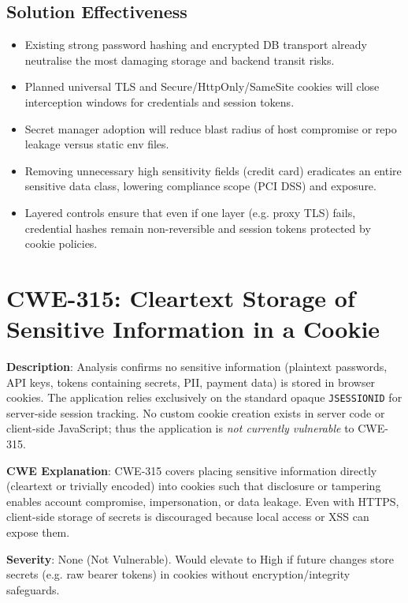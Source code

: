 \documentclass[]{UCD_CS_FYP_Report}
\begin{document}
\subsection{Solution Effectiveness}
\begin{itemize}
	\item Existing strong password hashing and encrypted DB transport already neutralise the most damaging storage and backend transit risks.
	\item Planned universal TLS and Secure/HttpOnly/SameSite cookies will close interception windows for credentials and session tokens.
	\item Secret manager adoption will reduce blast radius of host compromise or repo leakage versus static env files.
	\item Removing unnecessary high sensitivity fields (credit card) eradicates an entire sensitive data class, lowering compliance scope (PCI DSS) and exposure.
	\item Layered controls ensure that even if one layer (e.g. proxy TLS) fails, credential hashes remain non-reversible and session tokens protected by cookie policies.
\end{itemize}

\section{CWE-315: Cleartext Storage of Sensitive Information in a Cookie}

	\textbf{Description}: Analysis confirms no sensitive information (plaintext passwords, API keys, tokens containing secrets, PII, payment data) is stored in browser cookies. The application relies exclusively on the standard opaque \texttt{JSESSIONID} for server-side session tracking. No custom cookie creation exists in server code or client-side JavaScript; thus the application is \emph{not currently vulnerable} to CWE-315.

	\textbf{CWE Explanation}: CWE-315 covers placing sensitive information directly (cleartext or trivially encoded) into cookies such that disclosure or tampering enables account compromise, impersonation, or data leakage. Even with HTTPS, client-side storage of secrets is discouraged because local access or XSS can expose them.

	\textbf{Severity}: None (Not Vulnerable). Would elevate to High if future changes store secrets (e.g. raw bearer tokens) in cookies without encryption/integrity safeguards.
\end{document}
